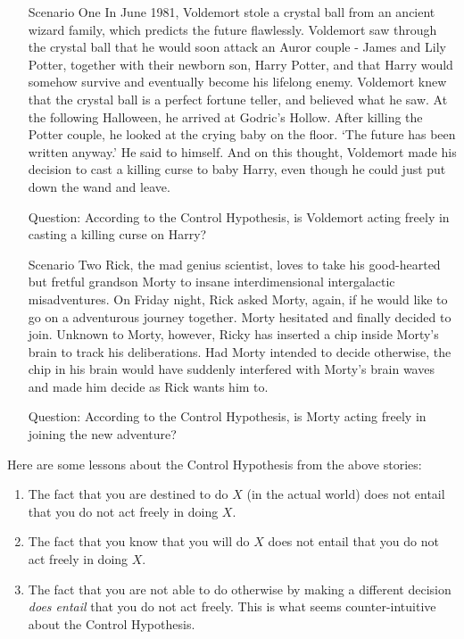\documentclass[12pt]{article}
\theoremstyle{definition}
\begin{document}
\begin{enumerate}
\item[Scenario One] In June 1981, Voldemort stole a crystal ball from an ancient wizard family, which predicts the future flawlessly. Voldemort saw through the crystal ball that he would soon attack an Auror couple - James and Lily Potter, together with their newborn son, Harry Potter, and that Harry would somehow survive and eventually become his lifelong enemy. Voldemort knew that the crystal ball is a perfect fortune teller, and believed what he saw. At the following Halloween, he arrived at Godric's Hollow. After killing the Potter couple, he looked at the crying baby on the floor. `The future has been written anyway.' He said to himself. And on this thought, Voldemort made his decision to cast a killing curse to baby Harry, even though he could just put down the wand and leave.

Question: According to the Control Hypothesis, is Voldemort acting freely in casting a killing curse on Harry?
\item[Scenario Two] Rick, the mad genius scientist, loves to take his good-hearted but fretful grandson Morty to insane interdimensional intergalactic misadventures. On Friday night, Rick asked Morty, again, if he would like to go on a adventurous journey together. Morty hesitated and finally decided to join. Unknown to Morty, however, Ricky has inserted a chip inside Morty's brain to track his deliberations. Had Morty intended to decide otherwise, the chip in his brain would have suddenly interfered with Morty's brain waves and made him decide as Rick wants him to. 

Question: According to the Control Hypothesis, is Morty acting freely in joining the new adventure?
\end{enumerate}

Here are some lessons about the Control Hypothesis from the above stories:
\begin{enumerate}
\item The fact that you are destined to do $X$ (in the actual world) does not entail that you do not act freely in doing $X$.
\item The fact that you know that you will do $X$ does not entail that you do not act freely in doing $X$.
\item The fact that you are not able to do otherwise by making a different decision \textit{does entail} that you do not act freely. This is what seems counter-intuitive about the Control Hypothesis.
\end{enumerate}
\end{document}
